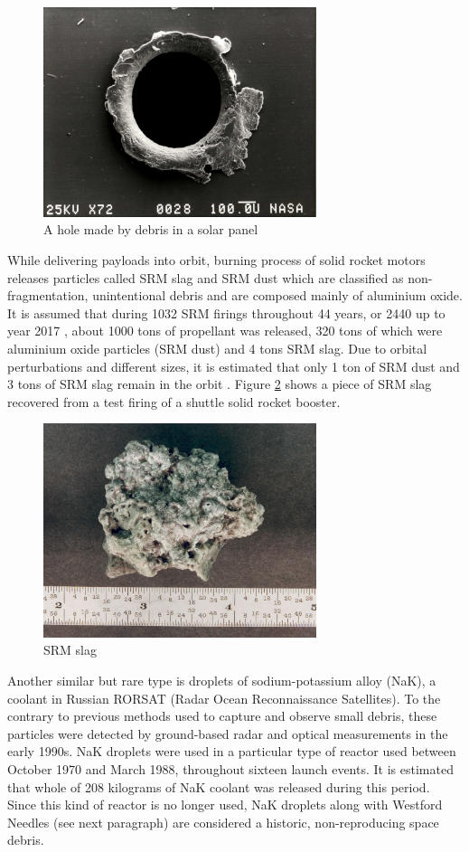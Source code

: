 \begin{figure}[H]
\centering
  \includegraphics[width=8cm]{images/hypervelocitycollision}
  \caption{A hole made by debris in a solar panel}
  \label{fig:hypervelocitycollision}
\end{figure}	
	
	While delivering payloads into orbit, burning process of solid rocket motors releases particles called SRM slag and SRM dust which are classified as non-fragmentation, unintentional debris and are composed mainly of aluminium oxide. It is assumed that during 1032 SRM firings throughout 44 years, or 2440 up to year 2017 \citep{esabr336}, about 1000 tons of propellant was released, 320 tons of which were aluminium oxide particles (SRM dust) and 4 tons SRM slag. Due to orbital perturbations and different sizes, it is estimated that only 1 ton of SRM dust and 3 tons of SRM slag remain in the orbit \citep{klinkrad2006space}. Figure \ref{fig:srmslag} shows a piece of SRM slag recovered from a test firing of a shuttle solid rocket booster.
	
\begin{figure}[H]
\centering
  \includegraphics[width=8cm]{images/slag}
  \caption{SRM slag}
  \label{fig:srmslag}
\end{figure}	
	
	Another similar but rare type is droplets of sodium-potassium alloy (NaK), a coolant in Russian RORSAT (Radar Ocean Reconnaissance Satellites). To the contrary to previous methods used to capture and observe small debris, these particles were detected by ground-based radar and optical measurements in the early 1990s. NaK droplets were used in a particular type of reactor used between October 1970 and March 1988, throughout sixteen launch events. It is estimated that whole of 208 kilograms of NaK coolant was released during this period. Since this kind of reactor is no longer used, NaK droplets along with Westford Needles (see next paragraph) are considered a historic, non-reproducing space debris. 
	
